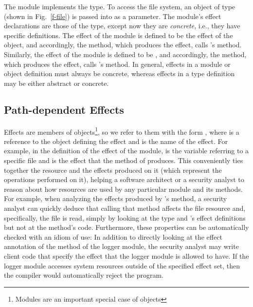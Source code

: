The  module implements the  type. To access the file system, an object of type  (shown in Fig.~\ref{f-file}) is passed into  as a parameter. The  module's effect declarations are those of the  type, except now they are \textit{concrete}, i.e., they have specific definitions. The  effect of the  module is defined to be the  effect of the  object, and accordingly, the  method, which produces the  effect, calls 's  method. Similarly, the  effect of the  module is defined to be , and accordingly, the  method, which produces the  effect, calls 's  method. In general, effects in a module or object definition must always be concrete, whereas effects in a type definition may be either abstract or concrete.


\subsection{Path-dependent Effects}

Effects are members of objects\footnote{Modules are an important special case of objects}, so we refer to them with the form , where  is a reference to the object defining the effect and  is the name of the effect. For example, in the definition of the  effect of the  module,  is the variable referring to a specific file and  is the effect that the  method of  produces. This conveniently ties together the resource and the effects produced on it (which represent the operations performed on it), helping a software architect or a security analyst to reason about how resources are used by any particular module and its methods. For example, when analyzing the effects produced by 's  method, a security analyst can quickly deduce that calling that method affects the file resource and, specifically, the file is read, simply by looking at the  type and 's effect definitions but not at the method's code. Furthermore, these properties can be automatically checked with an idiom of use: In addition to directly looking at the effect annotation of the method of the logger module, the security analyst may write client code that specify the effect that the logger module is allowed to have. If the logger module accesses system resources outside of the specified effect set, then the compiler would automatically reject the program.

